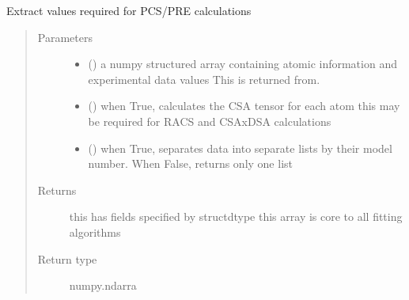 \documentclass[a4paper,10pt,english,openany,oneside]{sphinxmanual}
\begin{document}
\begin{fulllineitems}
\label{\detokenize{reference/generated/paramagpy.fit.extract_atom_data:paramagpy.fit.extract_atom_data}}
\sphinxAtStartPar
Extract values required for PCS/PRE calculations
\begin{quote}\begin{description}
\item[{Parameters}] \leavevmode\begin{itemize}
\item {} 
\sphinxAtStartPar
{} () \textendash{} a numpy structured array containing atomic information
and experimental data values
This is returned from.
{\hyperref[\detokenize{reference/generated/paramagpy.protein.CustomStructure.parse:paramagpy.protein.CustomStructure.parse}]{}}

\item {} 
\sphinxAtStartPar
{} (\sphinxstyleliteralemphasis{\sphinxupquote{, }}) \textendash{} when True, calculates the CSA tensor for each atom
this may be required for RACS and CSAxDSA calculations

\item {} 
\sphinxAtStartPar
{} (\sphinxstyleliteralemphasis{\sphinxupquote{, }}) \textendash{} when True, separates data into separate lists
by their model number. When False, returns only one list

\end{itemize}

\item[{Returns}] \leavevmode
\sphinxAtStartPar
{} \textendash{} this has fields specified by structdtype
this array is core to all fitting algorithms

\item[{Return type}] \leavevmode
\sphinxAtStartPar
numpy.ndarra

\end{description}\end{quote}

\end{fulllineitems}
\end{document}
